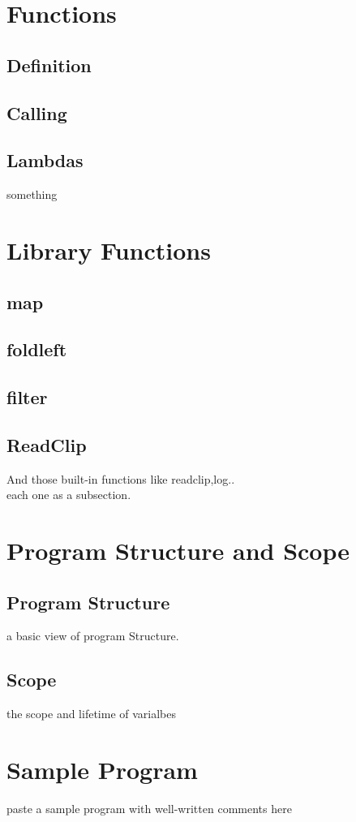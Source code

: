\documentclass[12pt]{article}
\begin{document}
\section{Functions}
\subsection{Definition}
\subsection{Calling}
\subsection{Lambdas}
something

\section{Library Functions}
\subsection{map}
\subsection{foldleft}
\subsection{filter}
\subsection{ReadClip}
And those built-in functions like readclip,log..\\ 
each one as a subsection.
\section{Program Structure and Scope}

\subsection{Program Structure}
a basic view of program Structure.\\
\subsection{Scope}
the scope and lifetime of varialbes\\

\section{Sample Program}
paste a sample program with well-written comments here\\
\end{document}
